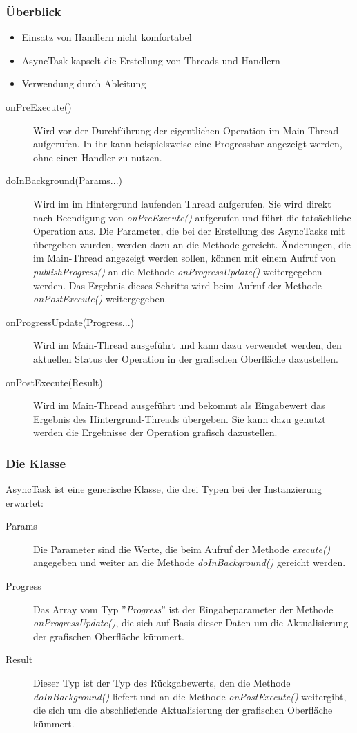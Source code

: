 \begin{frame}
   \frametitle{Überblick}
   \begin{itemize}
     	\item Einsatz von Handlern nicht komfortabel
     	\item AsyncTask kapselt die Erstellung von Threads und Handlern
     	\item Verwendung durch Ableitung
   \end{itemize}

	\begin{description}
		\item[onPreExecute()] Wird vor der Durchführung der eigentlichen 
			Operation im Main-Thread aufgerufen. In ihr kann beispielsweise 
			eine Progressbar angezeigt werden, ohne einen Handler zu nutzen.
		\item[doInBackground(Params...)] Wird im im Hintergrund laufenden Thread aufgerufen. 
			Sie wird direkt nach Beendigung von \emph{onPreExecute()} aufgerufen und führt die tatsächliche Operation aus. 
			Die Parameter, die bei der Erstellung des AsyncTasks mit übergeben wurden, 
			werden dazu an die Methode gereicht. Änderungen, die im Main-Thread angezeigt werden 
			sollen, können mit einem Aufruf von \emph{publishProgress()} an die Methode 
			\emph{onProgressUpdate()} weitergegeben werden. Das Ergebnis dieses Schritts wird beim Aufruf 
			der Methode \emph{onPostExecute()} weitergegeben.
		\item[onProgressUpdate(Progress...)] Wird im Main-Thread ausgeführt und 
			kann dazu verwendet werden, den aktuellen Status der Operation in der 
			grafischen Oberfläche dazustellen.
		\item[onPostExecute(Result)] Wird im Main-Thread ausgeführt und 
			bekommt als Eingabewert das Ergebnis des Hintergrund-Threads übergeben. Sie 
			kann dazu genutzt werden die Ergebnisse der Operation grafisch dazustellen.
	\end{description}
\end{frame}

\begin{frame}
   \frametitle{Die Klasse}

	AsyncTask ist eine generische Klasse, die drei Typen bei der 
	Instanzierung erwartet:

	\begin{description}
		\item[Params] Die Parameter sind die Werte, die beim Aufruf der Methode \emph{execute()} 
			angegeben und weiter an die Methode \emph{doInBackground()} gereicht werden.
		\item[Progress] Das Array vom Typ ''\emph{Progress}'' ist der Eingabeparameter der 
			Methode \emph{onProgressUpdate()}, die sich auf Basis dieser Daten um die 
			Aktualisierung der grafischen Oberfläche kümmert.
		\item[Result] Dieser Typ ist der Typ des Rückgabewerts, den die Methode 
			\emph{doInBackground()} liefert und an die Methode \emph{onPostExecute()} 
			weitergibt, die sich um die abschließende Aktualisierung der grafischen Oberfläche kümmert.
	\end{description}
\end{frame}

